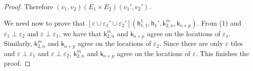 \documentclass[nocopyrightspace,preprint]{sigplanconf}
\newcommand{\eff}{\varepsilon}
\newcommand\heap{\ensuremath{\mathsf{h}}\xspace}
\newcommand\h{\heap}
\renewcommand\k{\ensuremath{\mathsf{k}}\xspace}
\begin{document}
\begin{proof}
Therefore $(v_1,v_2) (E_1 \times E_2) (v_1',v_2')$. 

We need now to prove that $[\eff \cup \eff_1' \cup \eff_2'](\h_{1,1}^1,\h_1',\k_{2,n}^m,\k_{o+p})$. From (1) and $\eff_1 \perp \eff_2$ and $\eff \perp \eff_1$, we have that $\k_{2,n}^m$ and $\k_{o+p}$ agree on the locations of $\eff_1$. Similarly, $\k_{2,n}^m$ and $\k_{o+p}$ agree on the locations of $\eff_2$. Since there are only $\eff$ tiles and $\eff \perp \eff_1$ and $\eff \perp \eff_2$, $\k_{2,n}^m$ and $\k_{o+p}$ agree on the locations of $\eff$. This finishes the proof.

\end{proof}
\end{document}
